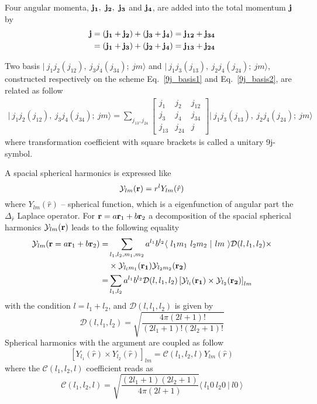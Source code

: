 Four angular momenta, $\bf j_1,~j_2,~j_3$ and $\bf j_4$, are added into the total momentum $\bf j$ by
\begin{align}
\label{9j_basis1}
\bf j & =\bf \left( j_1 + j_2 \right) + ( j_3 + j_4) = j_{12} + j_{34} \\
\label{9j_basis2}		
& = \bf ( j_1 + j_3 ) + \left( j_2  + j_4 \right) = j_{13} +j_{24}
\end{align}

Two basis  $\vert~ j_1 j_2 (j_{12}),~j_3 j_4 (j_{34});~jm \rangle$ and $\vert~ j_1 j_3 (j_{13}),~j_2 j_4 (j_{24});~jm \rangle $, constructed respectively on the scheme Eq.~\ref{9j_basis1} and Eq.~\ref{9j_basis2},  are related as follow
\begin{align}
\label{9j}
\vert~ j_1 j_2 (j_{12}),~j_3 j_4 (j_{34});~jm \rangle = \sum_{j_{13},j_{24}} 
\begin{bmatrix}
j_1 & j_2 & j_{12} \\ 
j_3 & j_4 & j_{34} \\ 
j_{13} & j_{24} & j
\end{bmatrix} 
\vert~ j_1 j_3 (j_{13}),~j_2 j_4 (j_{24});~jm \rangle 
\end{align}
where transformation coefficient with square brackets is called a unitary 9j-symbol.


  A spacial spherical harmonics is expressed like
  \begin{equation}
  \mathcal{Y}_{lm}({\bf r}) = r^{l} Y_{lm}(\hat{r})
  \end{equation}
  where $Y_{lm}(\hat{r})$  -- spherical function, which is a eigenfunction of angular part the $\Delta_{\hat{r}}$ Laplace operator.
  For ${\bf r} = a{\bf r}_1+b {\bf r}_2$ a decomposition of the spacial spherical harmonics $\mathcal{Y}_{lm}({\bf r})$ leads to the following equality
  \begin{align}
  \mathcal{Y}_{lm}({\bf r} = a{\bf r}_1+b {\bf r}_2)=& \sum_{l_1,l_2,m_1,m_2} a^{l_1} b^{l_2}
  \langle ~ l_1 m_1~l_2 m_2~ \vert ~l m~  \rangle \mathcal{D}(l,l_1,l_2) \times \nonumber \\
   & \times \mathcal{Y}_{l_l m_1}({\bf r_1})  \mathcal{Y}_{l_2 m_2}({\bf r_2}) \nonumber \\
   = & \sum_{l_1,l_2} a^{l_1} b^{l_2}
   \mathcal{D}(l,l_1,l_2) \left[ \mathcal{Y}_{l_l}({\bf r_1}) \times \mathcal{Y}_{l_2}({\bf r_2}) \right]_{lm} 
  \end{align}
  with the condition $l=l_1+l_2$, and $\mathcal{D}(l,l_1,l_2) $ is given by
  \begin{equation}
  \label{sphHarmDecomp}
  \mathcal{D}(l,l_1,l_2)  = \sqrt{\frac{4 \pi (2l+1)!}{(2l_1+1)! (2l_2+1)!}}
  \end{equation}
Spherical harmonics with the argument are coupled as follow
\begin{equation}
\left[ Y_{l_1}(\hat{r}) \times Y_{l_2}(\hat{r})\right]_{lm} =  \mathcal{C}(l_1,l_2,l) Y_{lm}(\hat{r})
\end{equation}
where the $\mathcal{C}(l_1,l_2,l)$ coefficient reads as
\begin{equation}
\mathcal{C}(l_1,l_2,l) = \sqrt{\frac{(2l_1+1)(2l_2+1)}{4 \pi (2l+1)}} \langle ~ l_1 0~l_2 0~ \vert ~l 0~  \rangle
\end{equation}

